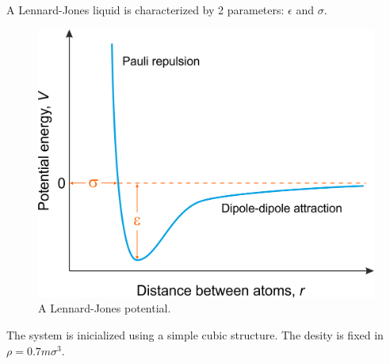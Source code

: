 \documentclass[a4paper,10pt]{article}
\begin{document}
A Lennard-Jones liquid is characterized by 2 parameters: $\epsilon$ and $\sigma$. 

\begin{figure}
	\centering
	\includegraphics[width=0.7\linewidth]{lennard-jones_potential}
	\caption{A Lennard-Jones potential.}
	\label{fig:lennard-jonespotential}
\end{figure}



The system is inicialized using a simple cubic structure. The desity is fixed in $\rho = 0.7 m\sigma^3$. 
\end{document}
